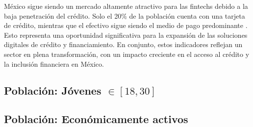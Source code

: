 México sigue siendo un mercado altamente atractivo para las fintechs debido a la baja penetración del crédito. Solo el 20\% de la población cuenta con una tarjeta de crédito, mientras que el efectivo sigue siendo el medio de pago predominante \cite{elfinanciero2024}. Esto representa una oportunidad significativa para la expansión de las soluciones digitales de crédito y financiamiento. En conjunto, estos indicadores reflejan un sector en plena transformación, con un impacto creciente en el acceso al crédito y la inclusión financiera en México.

\subsection*{Población: Jóvenes $\in[18,30]$}


\subsection*{Población: Económicamente activos}